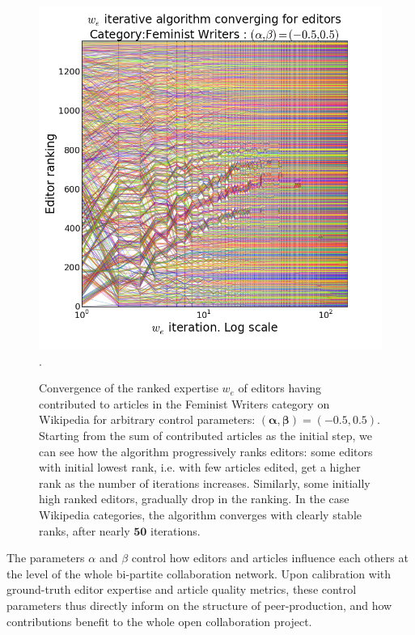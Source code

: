 \begin{figure}[!t]
\centering
\includegraphics[width=0.9\columnwidth]{../Figures/fem_editors_iter_converge.png}.
\caption{Convergence of the ranked expertise $w_e$ of editors having contributed to articles in the Feminist Writers category on Wikipedia for arbitrary control parameters: $\mathbf{(\alpha,\beta) =(-0.5, 0.5)}$. Starting from the sum of contributed articles as the initial step, we can see how the algorithm progressively ranks editors: some editors with initial lowest rank, i.e. with few articles edited, get a higher rank as the number of iterations increases. Similarly, some initially high ranked editors, gradually drop in the ranking. In the case Wikipedia categories, the algorithm converges with clearly stable ranks, after nearly $\mathbf{50}$ iterations.}
\label{fig:convergence}
\end{figure}


The parameters $\alpha$ and $\beta$ control how editors and articles influence each others at the level of the whole bi-partite collaboration network. Upon calibration with ground-truth editor expertise and article quality metrics, these control parameters thus directly inform on the structure of peer-production, and how contributions benefit to the whole open collaboration project. 


